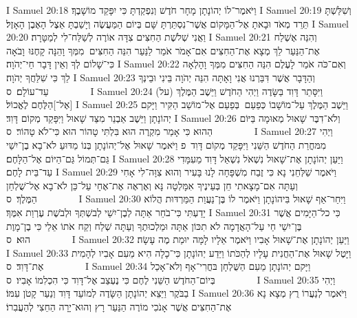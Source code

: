 I Samuel 20:18	וַיֹּאמֶר־לוֹ יְהוֹנָתָן מָחָר חֹדֶשׁ וְנִפְקַדְתָּ כִּי יִפָּקֵד מוֹשָׁבֶךָ׃
I Samuel 20:19	וְשִׁלַּשְׁתָּ תֵּרֵד מְאֹד וּבָאתָ אֶל־הַמָּקוֹם אֲשֶׁר־נִסְתַּרְתָּ שָּׁם בְּיוֹם הַמַּעֲשֶׂה וְיָשַׁבְתָּ אֵצֶל הָאֶבֶן הָאָזֶל׃
I Samuel 20:20	וַאֲנִי שְׁלֹשֶׁת הַחִצִּים צִדָּה אוֹרֶה לְשַׁלַּח־לִי לְמַטָּרָה׃
I Samuel 20:21	וְהִנֵּה אֶשְׁלַח אֶת־הַנַּעַר לֵךְ מְצָא אֶת־הַחִצִּים אִם־אָמֹר אֹמַר לַנַּעַר הִנֵּה הַחִצִּים  מִמְּךָ וָהֵנָּה קָחֶנּוּ  וָבֹאָה כִּי־שָׁלוֹם לְךָ וְאֵין דָּבָר חַי־יְהֹוָה׃
I Samuel 20:22	וְאִם־כֹּה אֹמַר לָעֶלֶם הִנֵּה הַחִצִּים מִמְּךָ וָהָלְאָה לֵךְ כִּי שִׁלַּחֲךָ יְהֹוָה׃
I Samuel 20:23	וְהַדָּבָר אֲשֶׁר דִּבַּרְנוּ אֲנִי וָאָתָּה הִנֵּה יְהֹוָה בֵּינִי וּבֵינְךָ עַד־עוֹלָם׃ {ס}        
I Samuel 20:24	וַיִּסָּתֵר דָּוִד בַּשָּׂדֶה וַיְהִי הַחֹדֶשׁ וַיֵּשֶׁב הַמֶּלֶךְ (על) [אֶל־]הַלֶּחֶם לֶאֱכוֹל׃
I Samuel 20:25	וַיֵּשֶׁב הַמֶּלֶךְ עַל־מוֹשָׁבוֹ כְּפַעַם  בְּפַעַם אֶל־מוֹשַׁב הַקִּיר וַיָּקם יְהוֹנָתָן וַיֵּשֶׁב אַבְנֵר מִצַּד שָׁאוּל וַיִּפָּקֵד מְקוֹם דָּוִד׃
I Samuel 20:26	וְלֹא־דִבֶּר שָׁאוּל מְאוּמָה בַּיּוֹם הַהוּא כִּי אָמַר מִקְרֶה הוּא בִּלְתִּי טָהוֹר הוּא כִּי־לֹא טָהוֹר׃ {ס}        
I Samuel 20:27	וַיְהִי מִמּחֳרַת הַחֹדֶשׁ הַשֵּׁנִי וַיִּפָּקֵד מְקוֹם דָּוִד {פ} וַיֹּאמֶר שָׁאוּל אֶל־יְהוֹנָתָן בְּנוֹ מַדּוּעַ לֹא־בָא בֶן־יִשַׁי גַּם־תְּמוֹל גַּם־הַיּוֹם אֶל־הַלָּחֶם׃
I Samuel 20:28	וַיַּעַן יְהוֹנָתָן אֶת־שָׁאוּל נִשְׁאֹל נִשְׁאַל דָּוִד מֵעִמָּדִי עַד־בֵּית לָחֶם׃
I Samuel 20:29	וַיֹּאמֶר שַׁלְּחֵנִי נָא כִּי זֶבַח מִשְׁפָּחָה לָנוּ בָּעִיר וְהוּא צִוָּה־לִי אָחִי וְעַתָּה אִם־מָצָאתִי חֵן בְּעֵינֶיךָ אִמָּלְטָה נָּא וְאֶרְאֶה אֶת־אֶחָי עַל־כֵּן לֹא־בָא אֶל־שֻׁלְחַן הַמֶּלֶךְ׃ {ס}        
I Samuel 20:30	וַיִּחַר־אַף שָׁאוּל בִּיהוֹנָתָן וַיֹּאמֶר לוֹ בֶּן־נַעֲוַת הַמַּרְדּוּת הֲלוֹא יָדַעְתִּי כִּי־בֹחֵר אַתָּה לְבֶן־יִשַׁי לְבשְׁתְּךָ וּלְבֹשֶׁת עֶרְוַת אִמֶּךָ׃
I Samuel 20:31	כִּי כל־הַיָּמִים אֲשֶׁר בֶּן־יִשַׁי חַי עַל־הָאֲדָמָה לֹא תִכּוֹן אַתָּה וּמַלְכוּתֶךָ וְעַתָּה שְׁלַח וְקַח אֹתוֹ אֵלַי כִּי בֶן־מָוֶת הוּא׃ {ס}        
I Samuel 20:32	וַיַּעַן יְהוֹנָתָן אֶת־שָׁאוּל אָבִיו וַיֹּאמֶר אֵלָיו לָמָּה יוּמַת מֶה עָשָׂה׃
I Samuel 20:33	וַיָּטֶל שָׁאוּל אֶת־הַחֲנִית עָלָיו לְהַכֹּתוֹ וַיֵּדַע יְהוֹנָתָן כִּי־כָלָה הִיא מֵעִם אָבִיו לְהָמִית אֶת־דָּוִד׃ {ס}        
I Samuel 20:34	וַיָּקם יְהוֹנָתָן מֵעִם הַשֻּׁלְחָן בּחֳרִי־אָף וְלֹא־אָכַל בְּיוֹם־הַחֹדֶשׁ הַשֵּׁנִי לֶחֶם כִּי נֶעְצַב אֶל־דָּוִד כִּי הִכְלִמוֹ אָבִיו׃ {ס}        
I Samuel 20:35	וַיְהִי בַבֹּקֶר וַיֵּצֵא יְהוֹנָתָן הַשָּׂדֶה לְמוֹעֵד דָּוִד וְנַעַר קָטֹן עִמּוֹ׃
I Samuel 20:36	וַיֹּאמֶר לְנַעֲרוֹ רֻץ מְצָא נָא אֶת־הַחִצִּים אֲשֶׁר אָנֹכִי מוֹרֶה הַנַּעַר רָץ וְהוּא־יָרָה הַחֵצִי לְהַעֲבִרוֹ׃
